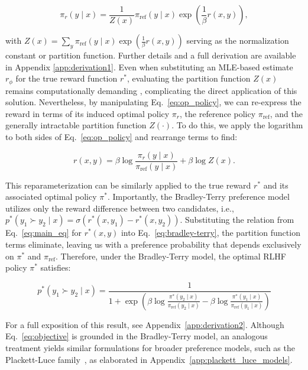 \begin{equation}\label{eq:op_policy}
    \pi_r(y\mid x) = \frac{1}{Z(x)}\pi_\text{ref}(y\mid x)\exp\left(\frac{1}{\beta}r(x, y)\right),
\end{equation}

with $Z(x) =\sum_{y}\pi_\text{ref}(y\mid x)\exp\left(\frac{1}{\beta}r(x, y)\right)$ serving as the normalization constant or partition function. Further details and a full derivation are available in Appendix \ref{app:derivation1}. Even when substituting an MLE-based estimate $r_{\phi}$ for the true reward function $r^*$, evaluating the partition function $Z(x)$ remains computationally demanding \citep{korbak2022reinforcement, go2023aligning}, complicating the direct application of this solution. Nevertheless, by manipulating Eq.~\ref{eq:op_policy}, we can re-express the reward in terms of its induced optimal policy $\pi_r$, the reference policy $\pi_\text{ref}$, and the generally intractable partition function $Z(\cdot)$. To do this, we apply the logarithm to both sides of Eq.~\ref{eq:op_policy} and rearrange terms to find:

\begin{equation}\label{eq:main_eq}
    r(x,y) =\beta \log \frac{\pi_r(y\mid x)}{\pi_\text{ref}(y\mid x)} + \beta \log Z(x).
\end{equation}

This reparameterization can be similarly applied to the true reward $r^*$ and its associated optimal policy $\pi^*$. Importantly, the Bradley-Terry preference model utilizes only the reward difference between two candidates, i.e., ${p^*(y_1 \succ y_2 \mid x) = \sigma(r^*(x, y_1) - r^*(x, y_2))}$. Substituting the relation from Eq.~\ref{eq:main_eq} for $r^*(x,y)$ into Eq.~\ref{eq:bradley-terry}, the partition function terms eliminate, leaving us with a preference probability that depends exclusively on $\pi^*$ and $\pi_\text{ref}$. Therefore, under the Bradley-Terry model, the optimal RLHF policy $\pi^*$ satisfies:

\begin{equation}\label{eq:objective}
    p^*(y_1\succ y_2 \mid x)=\frac{1}{1 + \exp\left(\beta \log \frac{\pi^*(y_2\mid x)}{\pi_\text{ref}(y_2\mid x)} - \beta \log \frac{\pi^*(y_1\mid x)}{\pi_\text{ref}(y_1\mid x)}\right)}
\end{equation}

For a full exposition of this result, see Appendix~\ref{app:derivation2}. Although Eq.~\ref{eq:objective} is grounded in the Bradley-Terry model, an analogous treatment yields similar formulations for broader preference models, such as the Plackett-Luce family~\citep{plackett1975analysis, luce2012individual}, as elaborated in Appendix~\ref{app:plackett_luce_models}.

